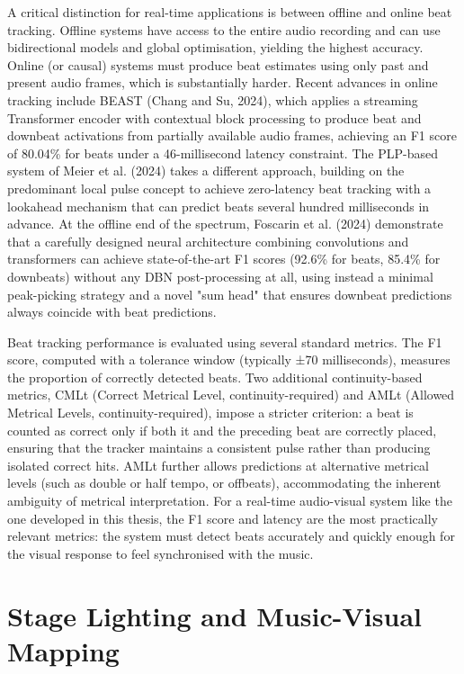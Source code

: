A critical distinction for real-time applications is between offline and online beat tracking. Offline systems have access to the entire audio recording and can use bidirectional models and global optimisation, yielding the highest accuracy. Online (or causal) systems must produce beat estimates using only past and present audio frames, which is substantially harder. Recent advances in online tracking include BEAST (Chang and Su, 2024), which applies a streaming Transformer encoder with contextual block processing to produce beat and downbeat activations from partially available audio frames, achieving an F1 score of 80.04\% for beats under a 46-millisecond latency constraint.\cite{chang2024beast}   The PLP-based system of Meier et al. (2024) takes a different approach, building on the predominant local pulse concept to achieve zero-latency beat tracking with a lookahead mechanism that can predict beats several hundred milliseconds in advance.\cite{petermeier20247}   At the offline end of the spectrum, Foscarin et al. (2024) demonstrate that a carefully designed neural architecture combining convolutions and transformers can achieve state-of-the-art F1 scores (92.6\% for beats, 85.4\% for downbeats) without any DBN post-processing at all, using instead a minimal peak-picking strategy and a novel "sum head" that ensures downbeat predictions always coincide with beat predictions.\cite{foscarin2024beatthis}   

Beat tracking performance is evaluated using several standard metrics. The F1 score, computed with a tolerance window (typically ±70 milliseconds), measures the proportion of correctly detected beats. Two additional continuity-based metrics, CMLt (Correct Metrical Level, continuity-required) and AMLt (Allowed Metrical Levels, continuity-required), impose a stricter criterion: a beat is counted as correct only if both it and the preceding beat are correctly placed, ensuring that the tracker maintains a consistent pulse rather than producing isolated correct hits. AMLt further allows predictions at alternative metrical levels (such as double or half tempo, or offbeats), accommodating the inherent ambiguity of metrical interpretation.\cite{foscarin2024beatthis}   For a real-time audio-visual system like the one developed in this thesis, the F1 score and latency are the most practically relevant metrics: the system must detect beats accurately and quickly enough for the visual response to feel synchronised with the music.

\section{Stage Lighting and Music-Visual Mapping}
\label{sec:ch2-stage-lighting}

